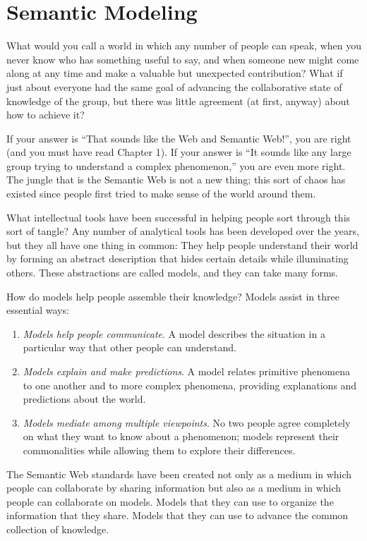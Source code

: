 \chapter{Semantic Modeling}
What would you call a world in which any number of people can speak,
when you never know who has something useful to say, and when someone
new might come along at any time and make a valuable but unexpected
contribution? What if just about everyone had the same goal of advancing
the collaborative state of knowledge of the group, but there was little
agreement (at first, anyway) about how to achieve it?

If your answer is ``That sounds like the Web and Semantic Web!'', you
are right (and you must have read Chapter 1). If your answer is ``It
sounds like any large group trying to understand a complex phenomenon,''
you are even more right. The jungle that is the Semantic Web is not a
new thing; this sort of chaos has existed since people first tried to
make sense of the world around them.

What intellectual tools have been successful in helping people sort
through this sort of tangle? Any number of analytical tools has been
developed over the years, but they all have one thing in common: They
help people understand their world by forming an abstract description
that hides certain details while illuminating others. These abstractions
are called models, and they can take many forms.

How do models help people assemble their knowledge? Models assist in
three essential ways:


\begin{enumerate}
\def\labelenumi{\arabic{enumi}.}
\item
  \emph{Models help people communicate}. A model describes the situation
  in a particular way that other people can understand.
\item
  \emph{Models explain and make predictions}. A model relates primitive
  phenomena to one another and to more complex phenomena, providing
  explanations and predictions about the world.
\item
  \emph{Models mediate among multiple viewpoints}. No two people agree
  completely on what they want to know about a phenomenon; models
  represent their commonalities while allowing them to explore their
  differences.
\end{enumerate}

The Semantic Web standards have been created not only as a medium in
which people can collaborate by sharing information but also as a medium
in which people can collaborate on models. Models that they can use to
organize the information that they share. Models that they can use to
advance the common collection of knowledge.


